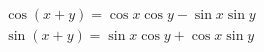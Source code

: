 \documentclass[12pt]{article}
\begin{document}
    \[ \begin{array}{c}
        \cos{ \left( x+y \right) }=\cos{x}\cos{y}-\sin{x}\sin{y} \\
        \sin{ \left( x+y \right) }=\sin{x}\cos{y}+\cos{x}\sin{y}
    \end{array} \]
\end{document}
